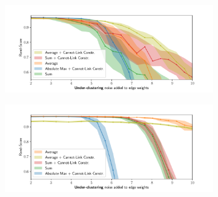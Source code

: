 \begin{figure}
\centering

    \begin{subfigure}[t]{0.49 \textwidth}
        \centering
        \includegraphics[width=\textwidth,trim=0.55in 0.1in 0.65in 0.45in,clip]{./figs/noise_plots/under_segment_plots_0.pdf}
    \end{subfigure} \hfill
    \begin{subfigure}[t]{0.49 \textwidth}
        \centering
        \includegraphics[width=\textwidth,trim=0.53in 0.1in 0.65in 0.45in,clip]{./figs/noise_plots/under_segment_plots_1.pdf}
    \end{subfigure}


\end{figure}
